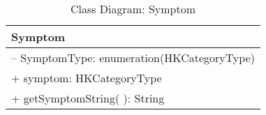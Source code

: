 \begin{table}[H]
\centering
\caption{Class Diagram: Symptom}

\hspace{1em}
\renewcommand{\arraystretch}{1.7}

\begin{tabular}{|l|}
\hline
\textbf{Symptom} \\
\hline
– SymptomType: enumeration(HKCategoryType) \\
+ symptom: HKCategoryType \\
\hdashline
+ getSymptomString( ): String \\
\hline
\end{tabular}
\end{table}
